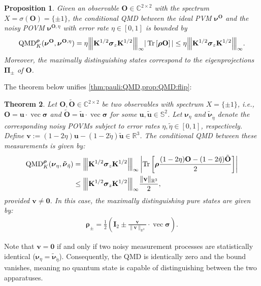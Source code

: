\documentclass[noinfoline]{imsart}\setcounter{tocdepth}{2}
\renewcommand{\b}[1]{\mathbb{#1}} %
\newcommand{\m}[1]{\mathbf{#1}} %
\newcommand{\mb}[1]{\boldsymbol{#1}} %
\newcommand{\tr}[1]{\operatorname{Tr}\left[#1\right]}
\newcommand{\vertiii}[1]{{\left\vert\kern-0.25ex\left\vert\kern-0.25ex\left\vert #1 
    \right\vert\kern-0.25ex\right\vert\kern-0.25ex\right\vert}} %
\newcommand{\QMD}{\operatorname{QMD}}
\renewcommand{\vec}{\operatorname{vec}}
\theoremstyle{plain}
\newtheorem{theorem}{Theorem}[section]
\newtheorem{proposition}[theorem]{Proposition}
\begin{document}
\begin{proposition}\label{prop:QMD:flip}
Given an observable $\m{O} \in \b{C}^{2 \times 2}$ with the spectrum $X = \sigma(\m{O}) = \{\pm 1\}$, the conditional QMD between the ideal PVM $\mb{\nu}^{\m{O}}$ and the noisy POVM $\mb{\nu}^{\m{O}, \eta}$ with error rate $\eta \in [0, 1]$ is bounded by
\begin{align*}
    \QMD_{K}^{\mb{\rho}}(\mb{\nu}^{\m{O}}, \mb{\nu}^{\m{O}, \eta}) = \eta \vertiii{\m{K}^{1/2} \mb{\sigma}_{z} \m{K}^{1/2}}_{\infty} |\tr{\mb{\rho} \m{O}}| \le \eta \vertiii{\m{K}^{1/2} \mb{\sigma}_{z} \m{K}^{1/2}}_{\infty}.
\end{align*}
Moreover, the maximally distinguishing states correspond to the eigenprojections $\m{\Pi}_{\pm}$ of $\m{O}$.
\end{proposition}

The theorem below unifies \cref{thm:pauli:QMD,prop:QMD:flip}:

\begin{theorem}\label{thm:two:bit:flip}
Let $\m{O}, \tilde{\m{O}} \in \b{C}^{2 \times 2}$ be two observables with spectrum $X = \{\pm 1\}$, i.e., $\m{O} = \m{u} \cdot \vec{\mb{\sigma}}$ and $\tilde{\m{O}} = \tilde{\m{u}} \cdot \vec{\mb{\sigma}}$ for some $\m{u}, \tilde{\m{u}} \in \b{S}^{2}$. Let $\mb{\nu}_{\eta}$ and $\mb{\tilde{\nu}}_{\tilde{\eta}}$ denote the corresponding noisy POVMs subject to error rates $\eta, \tilde{\eta} \in [0, 1]$, respectively. 
Define $\m{v} := (1-2\eta) \m{u} - (1-2 \tilde{\eta}) \tilde{\m{u}} \in \b{R}^{3}$. The conditional QMD between these measurements is given by:
\begin{align}\label{eq:QMD:flip:two}
    \QMD_{K}^{\mb{\rho}}(\mb{\nu}_{\eta}, \mb{\tilde{\nu}}_{\tilde{\eta}}) 
    &= \vertiii{\m{K}^{1/2} \mb{\sigma}_{z} \m{K}^{1/2}}_{\infty} \left|\tr {\mb{\rho} \frac{(1-2 \eta) \m{O} - (1-2 \tilde{\eta}) \tilde{\m{O}}}{2}} \right| \\
    &\le \vertiii{\m{K}^{1/2} \mb{\sigma}_{z} \m{K}^{1/2}}_{\infty} \frac{\|\m{v}\|_{\b{R}^{3}}}{2}, \nonumber 
\end{align}
provided $\m{v} \neq \m{0}$. In this case, the maximally distinguishing pure states are given by:
\begin{align*}
    \mb{\rho}_{\pm} = \frac{1}{2} \left(\m{I}_{2} \pm \frac{\m{v}}{\|\m{v}\|_{\b{R}^{3}}} \cdot \vec{\mb{\sigma}} \right).
\end{align*}
\end{theorem}

Note that $\m{v} = \m{0}$ if and only if two noisy measurement processes are statistically identical ($\mb{\nu}_{\eta} = \mb{\tilde{\nu}}_{\tilde{\eta}}$). Consequently, the QMD is identically zero and the bound vanishes, meaning no quantum state is capable of distinguishing between the two apparatuses. 
\end{document}
